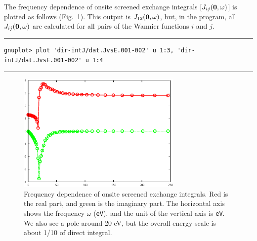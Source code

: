 \documentclass{article}
\begin{document}
The frequency dependence of onsite screened exchange integrals [$J_ {ij}({\bf 0},\omega)$] is plotted as follows (Fig.~\ref{JvsE}). This output is $J_{12}({\bf 0},\omega)$, but, in the program, all $J_{ij}({\bf 0},\omega)$ are calculated for all pairs of the Wannier functions $i$ and $j$.
\vspace{5mm}\hrule
\begin{verbatim}
gnuplot> plot 'dir-intJ/dat.JvsE.001-002' u 1:3, 'dir-intJ/dat.JvsE.001-002' u 1:4  
\end{verbatim}
\hrule\vspace{5mm}
\begin{figure}[H] 
\centering
\includegraphics[width=8cm]{JvsE-Al.eps}
\caption{Frequency dependence of onsite screened exchange integrals. Red is the real part, and green is the imaginary part. The horizontal axis shows the frequency $\omega$ ({\tt eV}), and the unit of the vertical axis is {\tt eV}. We also see a pole around 20 eV, but the overall energy scale is about 1/10 of direct integral.}
\label{JvsE}
\end{figure}

\clearpage 
\end{document}
